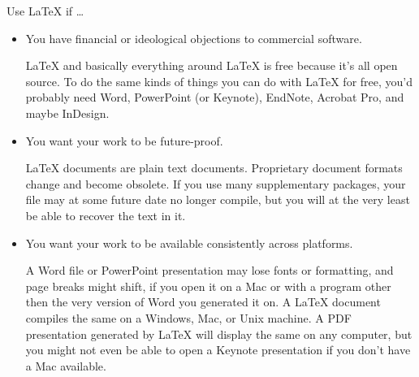 \begin{frame}{Use \LaTeX{} if \dots}

\begin{itemize}
\item You have financial or ideological objections to commercial
  software.

\begin{articleonly}
\LaTeX{} and basically everything around \LaTeX{} is free because it's
all open source. To do the same kinds of things you can do with
\LaTeX{} for free, you'd probably need Word, PowerPoint (or Keynote), EndNote,
Acrobat Pro, and maybe InDesign.
\end{articleonly}

\item You want your work to be future-proof.

\begin{articleonly}
\LaTeX{} documents are plain text documents. Proprietary document
formats change and become obsolete. If you use many supplementary
packages, your file may at some future date no longer compile, but you
will at the very least be able to recover the text in it.
\end{articleonly}

\item You want your work to be available consistently across platforms.

\begin{articleonly}
A Word file or PowerPoint presentation may lose fonts or formatting,
and page breaks might shift, if you open it on a Mac or with a program
other then the very version of Word you generated it on.  A \LaTeX{}
document compiles the same on a Windows, Mac, or Unix machine.  A PDF
presentation generated by \LaTeX{} will display the same on any
computer, but you might not even be able to open a Keynote
presentation if you don't have a Mac available.
\end{articleonly}
\end{itemize}

\end{frame}


